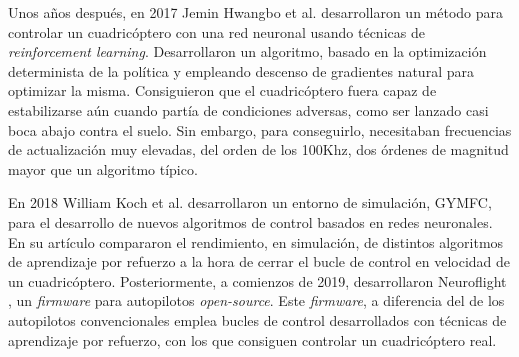Unos años después, en 2017 Jemin Hwangbo et al. \cite{hwangbo2017control} desarrollaron un método para controlar un cuadricóptero con una red neuronal usando técnicas de \textit{reinforcement learning}. Desarrollaron un algoritmo, basado en la optimización determinista de la política y empleando descenso de gradientes natural para optimizar la misma. Consiguieron que el cuadricóptero fuera capaz de estabilizarse aún cuando partía de condiciones adversas, como ser lanzado casi boca abajo contra el suelo. Sin embargo, para conseguirlo, necesitaban frecuencias de actualización muy elevadas, del orden de los 100Khz, dos órdenes de magnitud mayor que un algoritmo típico.

 En 2018 William Koch et al. \cite{koch2019reinforcement} desarrollaron un entorno de simulación, GYMFC, para el desarrollo de nuevos algoritmos de control basados en redes neuronales. En su artículo compararon el rendimiento, en simulación, de distintos algoritmos de aprendizaje por refuerzo a la hora de cerrar el bucle de control en velocidad de un cuadricóptero. Posteriormente, a comienzos de 2019, desarrollaron Neuroflight \cite{koch2019neuroflight}, un \textit{firmware} para autopilotos \textit{open-source}. Este \textit{firmware}, a diferencia del de los autopilotos convencionales emplea bucles de control desarrollados con técnicas de aprendizaje por refuerzo, con los que consiguen controlar un cuadricóptero real. 

 